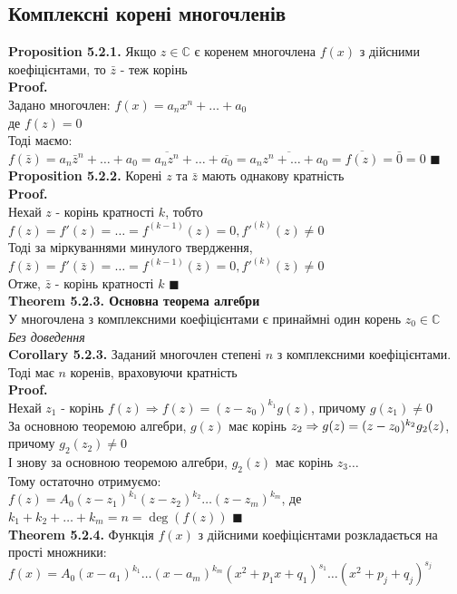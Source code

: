 \documentclass[a4paper, 14pt]{extarticle}
\def\prp#1{\textbf{Proposition {#1}}}
\def\th#1{\textbf{Theorem {#1}}}
\def\crl#1{\textbf{Corollary {#1}}}
\def\proof{\textbf{Proof.}\\}
\def\bigline{\vspace{5mm}\\}
\def\qed{$\blacksquare$}
\begin{document}
\subsection{Комплексні корені многочленів}
\prp{5.2.1.} Якщо $z \in \mathbb{C}$ є коренем многочлена $f(x)$ з дійсними коефіцієнтами, то $\bar{z}$ - теж корінь\\
\proof
Задано многочлен:
$f(x) = a_n x^n + \dots + a_0$\\
де $f(z) = 0$\\
Тоді маємо:\\
$f(\bar{z}) = a_n \bar{z}^n + \dots + a_0 = \overline{a_n z^n} + \dots + \overline{a_0} = \overline{a_n z^n + \dots + a_0} = \overline{f(z)} = \bar{0} = 0$ \qed
\bigline
\prp{5.2.2.} Корені $z$ та $\bar{z}$ мають однакову кратність\\
\proof
Нехай $z$ - корінь кратності $k$, тобто $f(z) = f'(z) = \dots = f^{(k-1)}(z) = 0, f'^{(k)}(z) \neq 0$\\
Тоді за міркуваннями минулого твердження,\\
$f(\bar{z}) = f'(\bar{z}) = \dots = f^{(k-1)}(\bar{z}) = 0, f'^{(k)}(\bar{z}) \neq 0$ \\ Отже, $\bar{z}$ - корінь кратності $k$ \qed
\bigline
\th{5.2.3. Основна теорема алгебри}\\
У многочлена з комплексними коефіцієнтами є принаймні один корень $z_0 \in \mathbb{C}$\\
\textit{Без доведення}
\bigline
\crl{5.2.3.} Заданий многочлен степені $n$ з комплексними коефіцієнтами. Тоді має $n$ коренів, враховуючи кратність\\
\proof
Нехай $z_1$ - корінь $f(z) \Rightarrow f(z) = (z-z_0)^{k_1} g(z)$, причому $g(z_1) \neq 0$\\
За основною теоремою алгебри, $g(z)$ має корінь $z_2 \Rightarrow \\ g(z) = (z-z_0)^{k_2} g_2(z)$, причому $g_2(z_2) \neq 0$\\
І знову за основною теоремою алгебри, $g_2(z)$ має корінь $z_3 \dots$\\
Тому остаточно отримуємо:\\
$f(z) = A_0(z-z_1)^{k_1}(z-z_2)^{k_2}\dots(z-z_m)^{k_m}$, де\\
$k_1 + k_2 + \dots + k_m = n = \deg(f(z))$ \qed
\bigline
\th{5.2.4.} Функція $f(x)$ з дійсними коефіцієнтами розкладається на прості множники:\\
$f(x) = A_0 (x-a_1)^{k_1} \dots (x-a_m)^{k_m} (x^2+p_1x+q_1)^{s_1} \dots (x^2+p_j+q_j)^{s_j}$\\
\end{document}
